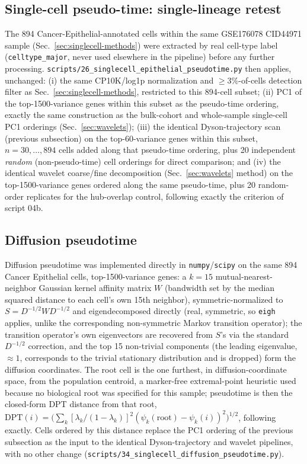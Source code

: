 \documentclass[11pt]{article}
\begin{document}
\subsection{Single-cell pseudo-time: single-lineage retest}
\label{sec:epithelial-methods}

The 894 Cancer-Epithelial-annotated cells within the same GSE176078
CID44971 sample (Sec.~\ref{sec:singlecell-methods}) were extracted by
real cell-type label (\texttt{celltype\_major}, never used elsewhere in
the pipeline) before any further processing.
\texttt{scripts/26\_singlecell\_epithelial\_pseudotime.py} then applies,
unchanged: (i) the same CP10K/log1p normalization and $\ge\!3\%$-of-cells
detection filter as Sec.~\ref{sec:singlecell-methods}, restricted to
this 894-cell subset; (ii) PC1 of the top-1500-variance genes within
this subset as the pseudo-time ordering, exactly the same construction
as the bulk-cohort and whole-sample single-cell PC1 orderings
(Sec.~\ref{sec:wavelets}); (iii) the identical Dyson-trajectory scan
(previous subsection) on the top-60-variance genes within this subset,
$n=30,\dots,894$ cells added along that pseudo-time ordering, plus 20
independent \emph{random} (non-pseudo-time) cell orderings for direct
comparison; and (iv) the identical wavelet coarse/fine decomposition
(Sec.~\ref{sec:wavelets} method) on the top-1500-variance genes ordered
along the same pseudo-time, plus 20 random-order replicates for the
hub-overlap control, following exactly the criterion of script 04b.

\subsection{Diffusion pseudotime}
\label{sec:dpt-methods}

Diffusion pseudotime \citep{haghverdi2016} was implemented directly in
\texttt{numpy}/\texttt{scipy} on the same 894 Cancer Epithelial cells,
top-1500-variance genes: a $k=15$ mutual-nearest-neighbor Gaussian
kernel affinity matrix $W$ (bandwidth set by the median squared
distance to each cell's own 15th neighbor), symmetric-normalized to
$S=D^{-1/2}WD^{-1/2}$ and eigendecomposed directly (real, symmetric,
so \texttt{eigh} applies, unlike the corresponding non-symmetric Markov
transition operator); the transition operator's own eigenvectors are
recovered from $S$'s via the standard $D^{-1/2}$ correction, and the
top 15 non-trivial components (the leading eigenvalue, $\approx\!1$,
corresponds to the trivial stationary distribution and is dropped) form
the diffusion coordinates. The root cell is the one furthest, in
diffusion-coordinate space, from the population centroid, a
marker-free extremal-point heuristic used because no biological root
was specified for this sample; pseudotime is then the closed-form DPT
distance from that root,
$\mathrm{DPT}(i)=\big(\sum_k[\lambda_k/(1-\lambda_k)]^2(\psi_k(\mathrm{root})-\psi_k(i))^2\big)^{1/2}$,
following \citet{haghverdi2016} exactly. Cells ordered by this distance
replace the PC1 ordering of the previous subsection as the input to the
identical Dyson-trajectory and wavelet pipelines, with no other change
(\texttt{scripts/34\_singlecell\_diffusion\_pseudotime.py}).
\end{document}

